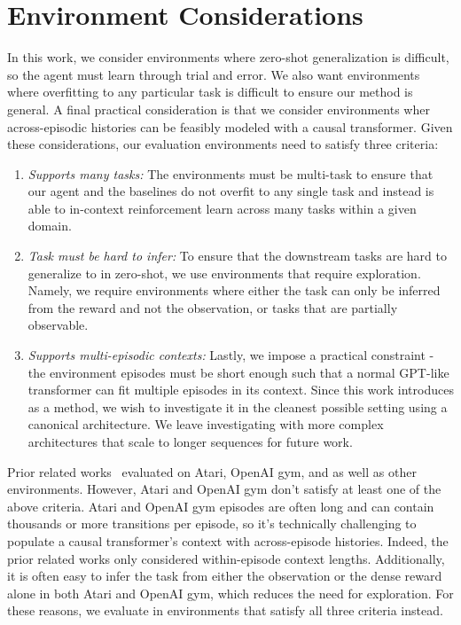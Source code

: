 \newpage
\section{Environment Considerations}
\label{app:envs}
In this work, we consider environments where zero-shot generalization is difficult, so the agent must learn through trial and error. We also want environments where overfitting to any particular task is difficult to ensure our method is general. A final practical consideration is that we consider environments wher across-episodic histories can be feasibly modeled with a causal transformer. Given these considerations, our evaluation environments need to satisfy three criteria:

\begin{enumerate}
\item {\it Supports many tasks:} The environments must be multi-task to ensure that our agent and the baselines do not overfit to any single task and instead is able to in-context reinforcement learn across many tasks within a given domain.

\item {\it Task must be hard to infer:} To ensure that the downstream tasks are hard to generalize to in zero-shot, we use environments that require exploration. Namely, we require environments where either the task can only be inferred from the reward and not the observation, or tasks that are partially observable.

\item {\it Supports multi-episodic contexts:} Lastly, we impose a practical constraint - the environment episodes must be short enough such that a normal GPT-like transformer can fit multiple episodes in its context. Since this work introduces \name as a method, we wish to investigate it in the cleanest possible setting using a canonical architecture. We leave investigating \name with more complex architectures that scale to longer sequences for future work.
\end{enumerate}

Prior related works~\citep{chen2021dt, lee2022mgdt, janner2021tto, reed2022gato} evaluated on Atari, OpenAI gym, and as well as other environments. However, Atari and OpenAI gym don't satisfy at least one of the above criteria. Atari and OpenAI gym episodes are often long and can contain thousands or more transitions per episode, so it's technically challenging to populate a causal transformer's context with across-episode histories. Indeed, the prior related works only considered within-episode context lengths. Additionally, it is often easy to infer the task from either the observation or the dense reward alone in both Atari and OpenAI gym, which reduces the need for exploration. For these reasons, we evaluate in environments that satisfy all three criteria instead.

